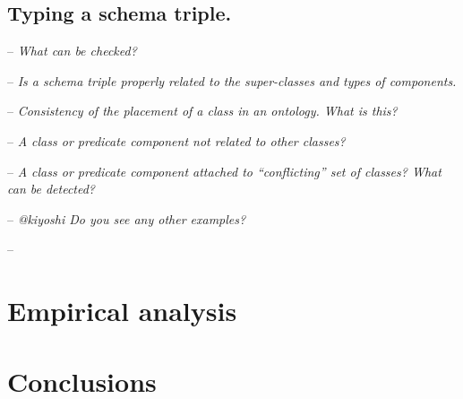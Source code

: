 \documentclass[runningheads]{llncs}
\newcommand{\nl}{\hfill\break}
\newcommand{\notes}[1]{\noindent\begin{small}-- \emph{#1}\\\end{small}}
\begin{document}
\subsection{Typing a schema triple.}\nl

\notes{What can be checked?}
\notes{Is a schema triple properly related to the super-classes and types of components.}
\notes{Consistency of the placement of a class in an ontology. What is this?}
\notes{A class or predicate component not related to other classes?}
\notes{A class or predicate component attached to ``conflicting'' set of classes? What can be detected?}
\notes{@kiyoshi Do you see any other examples?}
\notes{}





\section{Empirical analysis}




\section{Conclusions}



%



\end{document}
